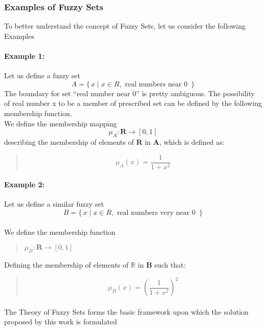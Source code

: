 \documentclass[a4paper,openany]{book}
\begin{document}
				\subsubsection{Examples of Fuzzy Sets}
					To better understand the concept of Fuzzy Sets, let us consider the following Examples
					\paragraph{Example 1:}
						Let us define a fuzzy set 
						\[
						A = \{\, x \mid x \in R, \text{ real numbers near 0 } \,\}
						\]
						The boundary for set “real number near 0” is pretty ambiguous. The possibility of real number x to be a member of prescribed set can be defined by the following membership function.\\
						We define the membership mapping
						\begin{equation}
							\mu_A \colon \textbf{R} \to [0,1]
						\end{equation}
						describing the membership of elements of $\mathbf{R}$ in $\mathbf{A}$, which is defined as:
						\begin{verse}
							\begin{equation}
								\mu_A(x) = \frac{1}{1+x^2}
							\end{equation}
						\end{verse}
					\paragraph{Example 2:}
						Let us define a similar fuzzy set 
						\[
						B = \{\, x \mid x \in R, \text{ real numbers very near 0 } \,\}
						\]
						\\We define the membership function
						\begin{verse}
							$\mu_B\colon \textbf{R} \to [0,1] $
						\end{verse}
						Defining the membership of elements of $\mathbb{R}$ in $\mathbf{B}$ such that:
						\begin{verse}
							\begin{equation}
								\mu_B(x) = \left( \frac{1}{1+x^2} \right)^{2}
							\end{equation}
						\end{verse}
					\paragraph{}
						The Theory of Fuzzy Sets forms the basic framework upon which the solution proposed by this work is formulated		
\end{document}

